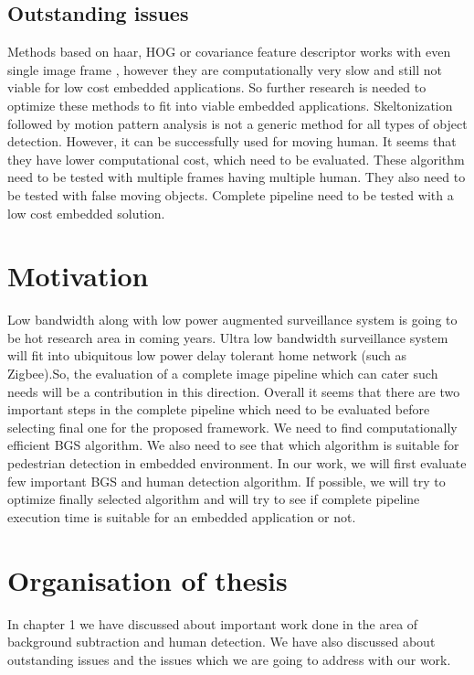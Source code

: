 \subsection{Outstanding issues}
Methods based on haar, HOG or covariance feature descriptor works with
even single image frame , however they are computationally very slow and
still not viable for low cost embedded applications. So further research
is needed to optimize these methods to fit into viable embedded
applications. Skeltonization followed by motion pattern analysis is not
a generic method for all types of object detection. However, it can be
successfully used for moving human. It seems that they have lower
computational cost, which need to be evaluated. These algorithm need to
be tested with multiple frames having multiple human. They also need to
be tested with false moving objects. Complete pipeline need to be tested
with a low cost embedded solution.\\

\pagebreak

\section{Motivation}
Low bandwidth along with low power augmented surveillance system is
going to be hot research area in coming years. Ultra low bandwidth
surveillance system will fit into ubiquitous low power delay tolerant
home network (such as Zigbee).So, the evaluation of a complete image
pipeline which can cater such needs will be a contribution in this
direction. Overall it seems that there are two important steps in the
complete pipeline which need to be evaluated before selecting final one
for the proposed framework. We need to find computationally efficient
BGS algorithm. We also need to see that which algorithm is suitable for
pedestrian detection in embedded environment.  In our work, we will
first evaluate few important BGS and human detection algorithm.
If possible, we will try to optimize finally selected algorithm and will
try to see if complete pipeline execution time is suitable for an
embedded application or not.\\

\pagebreak

\section{Organisation of thesis}

In chapter 1 we have discussed about important work done in the area of
background subtraction and human detection. We have also discussed about
outstanding issues and the issues which we are going to address with our
work.\\

